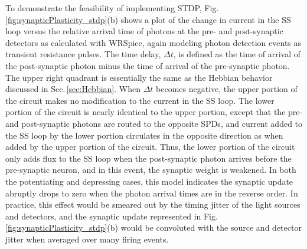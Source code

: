 \documentclass[aip,amsmath,amssymb,reprint,nofootinbib]{revtex4-1}
\begin{document}
To demonstrate the feasibility of implementing STDP, Fig.\,\ref{fig:synapticPlasticity_stdp}(b) shows a plot of the change in current in the SS loop versus the relative arrival time of photons at the pre- and post-synaptic detectors as calculated with WRSpice, again modeling photon detection events as transient resistance pulses. The time delay, $\Delta t$, is defined as the time of arrival of the post-synaptic photon minus the time of arrival of the pre-synaptic photon. The upper right quadrant is essentially the same as the Hebbian behavior discussed in Sec.\,\ref{sec:Hebbian}. When $\Delta t$ becomes negative, the upper portion of the circuit makes no modification to the current in the SS loop. The lower portion of the circuit is nearly identical to the upper portion, except that the pre- and post-synaptic photons are routed to the opposite SPDs, and current added to the SS loop by the lower portion circulates in the opposite direction as when added by the upper portion of the circuit. Thus, the lower portion of the circuit only adds flux to the SS loop when the post-synaptic photon arrives before the pre-synaptic neuron, and in this event, the synaptic weight is weakened. In both the potentiating and depressing cases, this model indicates the synaptic update abruptly drops to zero when the photon arrival times are in the reverse order. In practice, this effect would be smeared out by the timing jitter of the light sources and detectors, and the synaptic update represented in Fig.\,\ref{fig:synapticPlasticity_stdp}(b) would be convoluted with the source and detector jitter when averaged over many firing events.
\end{document}
